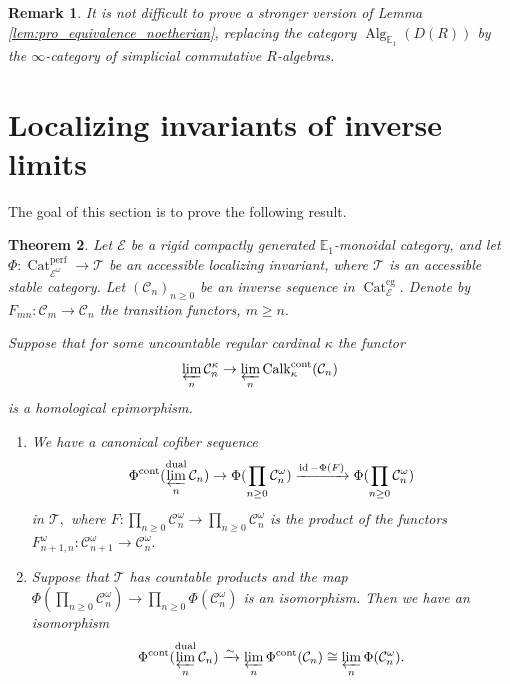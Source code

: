 \documentclass[11pt,leqno]{amsart}
\newtheorem{theo}{Theorem}[section]
\newtheorem{remark}[theo]{Remark}
\numberwithin{equation}{section}
\newcommand{\prolim}[1][]{\mathop{\varprojlim}\limits_{#1}}
\newcommand{\prodd}[1][]{\mathop{\prod}\limits_{#1}}
\newcommand{\xto}{\xrightarrow}
\newcommand{\Cat}{\operatorname{Cat}}
\newcommand{\cont}{\operatorname{cont}}
\newcommand{\cg}{\operatorname{cg}}
\newcommand{\dual}{\operatorname{dual}}
\newcommand{\bE}{{\mathbb E}}
\newcommand{\cC}{{\mathcal C}}
\newcommand{\cE}{{\mathcal E}}
\newcommand{\cT}{{\mathcal T}}
\newcommand{\perf}{\operatorname{perf}}
\newcommand{\Calk}{\operatorname{Calk}}
\newcommand{\Alg}{\operatorname{Alg}}
\newcommand{\id}{\operatorname{id}}
\begin{document}
\begin{remark}
	It is not difficult to prove a stronger version of Lemma \ref{lem:pro_equivalence_noetherian}, replacing the category $\Alg_{\bE_1}(D(R))$ by the $\infty$-category of simplicial commutative $R$-algebras.
\end{remark}

\section{Localizing invariants of inverse limits}
\label{sec:loc_invar_inverse_limits}

The goal of this section is to prove the following result.

\begin{theo}\label{th:local_invar_of_inverse_limits}
Let $\cE$ be a rigid compactly generated $\bE_1$-monoidal category, and let $\Phi:\Cat_{\cE^{\omega}}^{\perf}\to\cT$ be an accessible localizing invariant, where $\cT$ is an accessible stable category. Let $(\cC_n)_{n\geq 0}$ be an inverse sequence in $\Cat_{\cE}^{\cg}.$ Denote by $F_{mn}:\cC_m\to\cC_n$ the transition functors, $m\geq n.$ 

Suppose that for some uncountable regular cardinal $\kappa$ the functor
\begin{equation}\label{eq:hom_epi_assumption}
\prolim[n]\cC_n^{\kappa}\to\prolim[n]\Calk^{\cont}_{\kappa}(\cC_n)
\end{equation} is a homological epimorphism. 

\begin{enumerate}[label=(\roman*),ref=(\roman*)]
	\item We have a canonical cofiber sequence
	\begin{equation*}
		\Phi^{\cont}(\prolim[n]^{\dual}\cC_n)\to \Phi(\prodd[n\geq 0]\cC_n^{\omega})\xto{\id-\Phi(F)} \Phi(\prodd[n\geq 0]\cC_n^{\omega})
	\end{equation*}
	in $\cT,$ where $F:\prodd[n\geq 0]\cC_n^{\omega}\to \prodd[n\geq 0]\cC_n^{\omega}$ is the product of the functors $F_{n+1,n}^{\omega}:\cC_{n+1}^{\omega}\to\cC_n^{\omega}.$ \label{Phi^cont_of_lim^dual_exact_triangle}
	\item Suppose that $\cT$ has countable products and the map $\Phi(\prodd[n\geq 0]\cC_n^{\omega})\to\prodd[n\geq 0]\Phi(\cC_n^{\omega})$ is an isomorphism. Then we have an isomorphism
	\begin{equation*}
		\Phi^{\cont}(\prolim[n]^{\dual}\cC_n)\xto{\sim}\prolim[n]\Phi^{\cont}(\cC_n)\cong \prolim[n]\Phi(\cC_n^{\omega}).
	\end{equation*} \label{Phi^cont_commute_with_the_limit}
\end{enumerate}
\end{theo}
\end{document}
